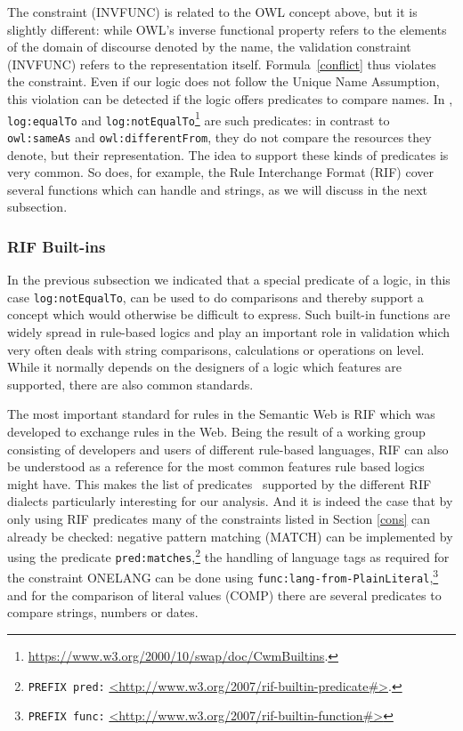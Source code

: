 The constraint (INVFUNC) is related to the OWL concept above, but it is slightly different: while OWL's inverse functional property refers to the elements of the domain of
discourse denoted by the name, the validation constraint (INVFUNC) refers to the representation itself. Formula~\ref{conflict} thus violates the constraint. 
Even if our logic does not 
follow the Unique Name Assumption, this violation can be detected if the logic offers predicates to compare names.
In \nthreelogic,
\texttt{log:equalTo} and \texttt{log:notEqualTo}\footnote{\url{https://www.w3.org/2000/10/swap/doc/CwmBuiltins}.} are such predicates: in contrast to
\texttt{owl:sameAs} and \texttt{owl:differentFrom}, they do not compare the resources they denote, but their representation. 
The idea to support these kinds of
predicates is very common. So does, for example,
the Rule Interchange Format (RIF) cover several functions which can handle \uris and strings, 
as we will discuss in the next subsection.
 






\subsubsection{RIF Built-ins}\label{bisec}
In the previous subsection we indicated that a special predicate of a logic,
in this case \texttt{log:notEqualTo}, can be used to do \uri comparisons
and thereby support a concept which would otherwise be difficult to express. 
Such built-in functions are widely spread in rule-based logics
and play an important role in \rdf validation which very often deals with string comparisons, calculations or operations on \uri level.
While it normally depends on the designers of a logic which features are supported, there are also common standards. 

The most important standard for rules in the Semantic Web is RIF
which was developed to exchange rules in the Web. 
Being the result of a \wwwc working group consisting of developers and users 
of different rule-based languages, RIF can also be understood as a reference for the most common features rule based logics might have. 
This makes the list of predicates~\cite{rifpredicates} supported by the different RIF dialects particularly interesting for our analysis. 
And it is indeed the case that by
only using RIF predicates many of the constraints listed in Section \ref{cons} can already be checked: 
negative pattern matching (MATCH) can be implemented by using the predicate 
\texttt{pred:matches},\footnote{
\texttt{PREFIX pred:} \url{<http://www.w3.org/2007/rif-builtin-predicate\#>}.} 
the handling of language tags as required for the constraint ONELANG can be done using \texttt{func:lang-from-PlainLiteral},\footnote{\texttt{PREFIX func:}
\url{<http://www.w3.org/2007/rif-builtin-function\#>}}
 and for the comparison of literal values (COMP) there are several predicates to compare strings, numbers or dates.


